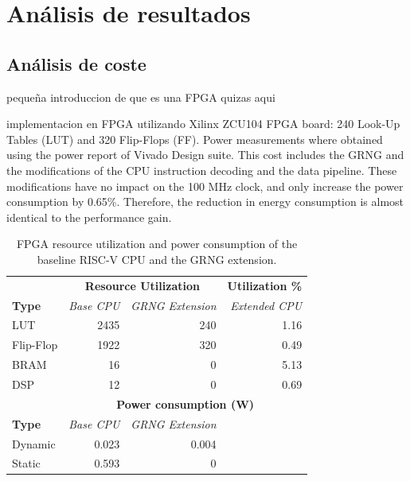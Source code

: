 
\section{Análisis de resultados}

\subsection{Análisis de coste}
\todo pequeña introduccion de que es una FPGA quizas aqui

implementacion en FPGA utilizando Xilinx ZCU104 FPGA board: 240 Look-Up Tables (LUT) and 320 Flip-Flops (FF). Power measurements where obtained using the power report of Vivado Design suite. %
This cost includes the GRNG and the modifications of the CPU instruction decoding and the data pipeline. These modifications have no impact on the 100 MHz clock, and only increase the power consumption by 0.65\%. Therefore, the reduction in energy consumption is almost identical to the performance gain. 

\begin{table}[ht]
\centering
\caption{FPGA resource utilization and power consumption of the baseline RISC-V CPU and the GRNG extension.}
\label{tab:riscv_fpga_utilization}
\begin{tabular}{lrrr}
\hline
& \multicolumn{2}{c}{\textbf{Resource Utilization}} & \textbf{Utilization \%}\\
\textbf{Type} & \textit{Base CPU} & \textit{GRNG Extension} & \textit{Extended CPU}\\ \hline
LUT	        & 2435 & 240 & 1.16 \\
Flip-Flop	& 1922 & 320 & 0.49 \\
BRAM	    & 16   & 0 & 5.13 \\
DSP	        & 12   & 0 & 0.69 \\ \hline
 & \multicolumn{3}{c}{\textbf{Power consumption (W)}} \\
\textbf{Type} & \textit{Base CPU} & \textit{GRNG Extension} \\ \hline
Dynamic & 0.023 & 0.004 \\
Static & 0.593 & 0 \\ \hline
\end{tabular}
\end{table}

